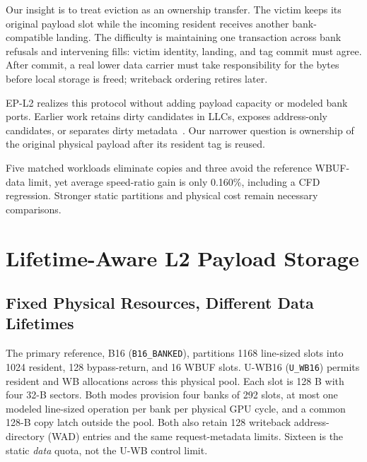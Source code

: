 \documentclass[conference,letterpaper]{IEEEtran}
\newcommand{\base}{B16}
\newcommand{\unif}{U-WB16}
\begin{document}
Our insight is to treat eviction as an ownership transfer. The victim keeps its original payload slot while the incoming resident receives another bank-compatible landing. The difficulty is maintaining one transaction across bank refusals and intervening fills: victim identity, landing, and tag commit must agree. After commit, a real lower data carrier must take responsibility for the bytes before local storage is freed; writeback ordering retires later.

EP-L2 realizes this protocol without adding payload capacity or modeled bank ports. Earlier work retains dirty candidates in LLCs, exposes address-only candidates, or separates dirty metadata~\cite{vwq,lastwrite,dbi}. Our narrower question is ownership of the original physical payload after its resident tag is reused.

Five matched workloads eliminate copies and three avoid the reference WBUF-data limit, yet average speed-ratio gain is only 0.160\%, including a CFD regression. Stronger static partitions and physical cost remain necessary comparisons.

\section{Lifetime-Aware L2 Payload Storage}
\subsection{Fixed Physical Resources, Different Data Lifetimes}
The primary reference, \base{} (\texttt{B16\_BANKED}), partitions 1168 line-sized slots into 1024 resident, 128 bypass-return, and 16 WBUF slots. \unif{} (\texttt{U\_WB16}) permits resident and WB allocations across this physical pool. Each slot is 128 B with four 32-B sectors. Both modes provision four banks of 292 slots, at most one modeled line-sized operation per bank per physical GPU cycle, and a common 128-B copy latch outside the pool. Both also retain 128 writeback address-directory (WAD) entries and the same request-metadata limits. Sixteen is the static \emph{data} quota, not the U-WB control limit.
\end{document}
